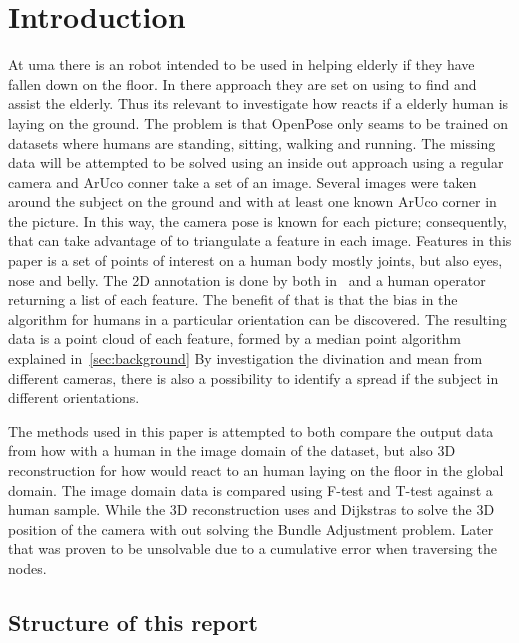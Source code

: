 \section{Introduction}%
\label{sec:intro}
At \ac{uma} there is an robot intended to be used in helping elderly if they have fallen down on the floor.
In there approach they are set on using \openpose to find and assist the elderly.
Thus its relevant to investigate how \openpose reacts if a elderly human is laying on the ground.
The problem is that OpenPose only seams to be trained on datasets where humans are standing, sitting, walking and running.
The missing data will be attempted to be solved using an inside out approach using a regular camera and ArUco conner take a set of an image.
Several images were taken around the subject on the ground and with at least one known ArUco corner in the picture.
In this way, the camera pose is known for each picture; consequently, that can take advantage of to triangulate a feature in each image.
Features in this paper is a set of points of interest on a human body mostly joints, but also eyes, nose and belly.
The 2D annotation is done by both \openpose in~\cite{qiao2017openpose} and a human operator returning a list of each feature.
The benefit of that is that the bias in the \openpose  algorithm for humans in a particular orientation can be discovered.
The resulting data is a point cloud of each feature, formed by a median point algorithm explained in~\ref{sec:background}
By investigation the divination and mean from different cameras, there is also a possibility to identify a spread if the subject in different orientations.

The methods used in this paper is attempted to both compare the output data from how \opnepose with a human in the image domain of the dataset, but also 3D reconstruction for how \onpepose would react to an human laying on the floor in the global domain.
The image domain data is compared using F-test and T-test against a human sample.
While the 3D reconstruction uses \aruco and Dijkstras to solve the 3D position of the camera with out solving the Bundle Adjustment problem.
Later that was proven to be unsolvable due to a cumulative error when traversing the nodes.

\subsection{Structure of this report}%
\label{sub:Structure_of_this_report}

